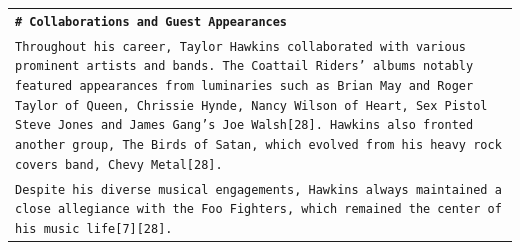 \documentclass[11pt]{article}
\begin{document}
\begin{longtable}{p{\textwidth}}
\vspace{1pt}
\texttt{\small{\textbf{\# Collaborations and Guest Appearances}}} \\
\texttt{\small{Throughout his career, Taylor Hawkins collaborated with various prominent artists and bands. The Coattail Riders' albums notably featured appearances from luminaries such as Brian May and Roger Taylor of Queen, Chrissie Hynde, Nancy Wilson of Heart, Sex Pistol Steve Jones and James Gang's Joe Walsh[28]. Hawkins also fronted another group, The Birds of Satan, which evolved from his heavy rock covers band, Chevy Metal[28].}} \\
\texttt{\small{Despite his diverse musical engagements, Hawkins always maintained a close allegiance with the Foo Fighters, which remained the center of his music life[7][28].}} \\


\end{longtable}
\end{document}
